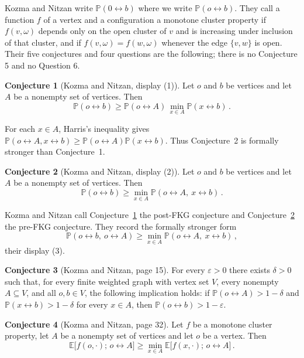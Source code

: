 \documentclass[11pt]{article}
\theoremstyle{definition}
\newtheorem{conjecture}{Conjecture}
\theoremstyle{remark}
\newcommand{\PP}{\mathbb P}
\newcommand{\EE}{\mathbb E}
\newcommand{\con}{\leftrightarrow}
\begin{document}
Kozma and Nitzan write $\PP(0\con b)$ where we write $\PP(o\con b)$. They call a function
$f$ of a vertex and a configuration a monotone cluster property if $f(v,\omega)$ depends
only on the open cluster of $v$ and is increasing under inclusion of that cluster, and if
$f(v,\omega)=f(w,\omega)$ whenever the edge $\{v,w\}$ is open. Their five conjectures and four questions are the
following; there is no Conjecture 5 and no Question 6.

\begin{conjecture}[Kozma and Nitzan, display (1)]\label{c1}
Let $o$ and $b$ be vertices and let $A$ be a nonempty set of vertices. Then
\[
 \PP(o\con b)\geq \PP(o\con A)\,\min_{x\in A}\PP(x\con b)\,.
\]
\end{conjecture}

For each $x\in A$, Harris's inequality gives
$\PP(o\con A,x\con b)\geq\PP(o\con A)\PP(x\con b)$. Thus Conjecture~2 is formally stronger
than Conjecture~1.

\begin{conjecture}[Kozma and Nitzan, display (2)]\label{c2}
Let $o$ and $b$ be vertices and let $A$ be a nonempty set of vertices. Then
\[
 \PP(o\con b)\geq \min_{x\in A}\PP(o\con A,\ x\con b)\,.
\]
\end{conjecture}

Kozma and Nitzan call Conjecture~\ref{c1} the post-FKG conjecture and Conjecture~\ref{c2}
the pre-FKG conjecture. They record the formally stronger form
\begin{equation}\label{eq:pre}
 \PP(o\con b,\ o\con A)\geq \min_{x\in A}\PP(o\con A,\ x\con b)\,,
\end{equation}
their display (3).

\begin{conjecture}[Kozma and Nitzan, page 15]\label{c3}
For every $\varepsilon>0$ there exists $\delta>0$ such that, for every finite weighted graph
with vertex set $V$, every nonempty $A\subseteq V$, and all $o,b\in V$, the following
implication holds: if $\PP(o\con A)>1-\delta$ and $\PP(x\con b)>1-\delta$ for every
$x\in A$, then $\PP(o\con b)>1-\varepsilon$.
\end{conjecture}

\begin{conjecture}[Kozma and Nitzan, page 32]\label{c4}
Let $f$ be a monotone cluster property, let $A$ be a nonempty set of vertices and let $o$
be a vertex. Then
\[
 \EE\bigl[f(o,\cdot);\,o\con A\bigr]\geq \min_{x\in A}\EE\bigl[f(x,\cdot);\,o\con A\bigr]\,.
\]
\end{conjecture}
\end{document}
